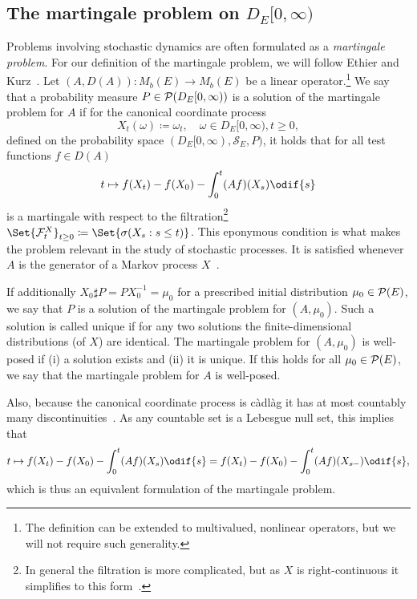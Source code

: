 \subsection{The martingale problem on \texorpdfstring{\(D_E[0,\infty)\)}{D([0,infinity), E)}}\label{sec:martingale-problem}

Problems involving stochastic dynamics are often formulated as a \textit{martingale problem}.
For our definition of the martingale problem, we will follow Ethier and Kurz~\cite[p.174]{ethierMarkovProcessesCharacterization1986}.
Let \((A, D(A)) : M_b(E) \to M_b(E)\) be a linear operator.\footnote{The definition can be extended to multivalued, nonlinear operators, but we will not require such generality.}
We say that a probability measure \(P \in \mathcal{P}(D_E[0,\infty))\) is a solution of the martingale problem for \( A \) if for the canonical coordinate process
\begin{equation}
  X_t(\omega) \coloneqq \omega_t, \quad \omega \in D_E[0,\infty), t \geq 0,
\end{equation}
defined on the probability space \((D_E[0,\infty), \mathscr{S}_E, P)\), it holds that for all test functions \(f \in D(A)\)
\begin{equation}\label{eq:mart-problem}
  t \mapsto f(X_t) - f(X_0) - \int_0^t (Af)(X_s) \odif{s}
\end{equation}
is a martingale with respect to the filtration\footnote{In general the filtration is more complicated, but as \( X \) is right-continuous it simplifies to this form~\cite[bottom of p. 173]{ethierMarkovProcessesCharacterization1986}.} \(\Set{\cF_t^X}_{t\geq0} \coloneqq \Set{\sigma(X_s : s \leq t)}\). %
This eponymous condition is what makes the problem relevant in the study of stochastic processes.
It is satisfied whenever \(A\) is the generator of a Markov process \(X\)~\cite[161-162]{ethierMarkovProcessesCharacterization1986}.

If additionally \( X_0 \sharp P = P X_0^{-1} = \mu_0 \) for a prescribed initial distribution \(\mu_0 \in \mathcal{P}(E)\), we say that \(P\) is a solution of the martingale problem for \((A,\mu_0)\).
Such a solution is called unique if for any two solutions the finite-dimensional distributions (of \(X\)) are identical.
The martingale problem for \((A,\mu_0)\) is well-posed if (i) a solution exists and (ii) it is unique.
If this holds for all \(\mu_0 \in \mathcal{P}(E)\), we say that the martingale problem for \(A\) is well-posed.

Also, because the canonical coordinate process is càdlàg it has at most countably many discontinuities~\cite[Lemma 3.5.1]{ethierMarkovProcessesCharacterization1986}.
As any countable set is a Lebesgue null set, this implies that
\begin{equation}\label{eq:mart-problem-s-}
  t \mapsto f(X_t) - f(X_0) - \int_0^t (Af)(X_s) \odif{s}
  = f(X_t) - f(X_0) - \int_0^t (Af)(X_{s-}) \odif{s},
\end{equation}
which is thus an equivalent formulation of the martingale problem.
